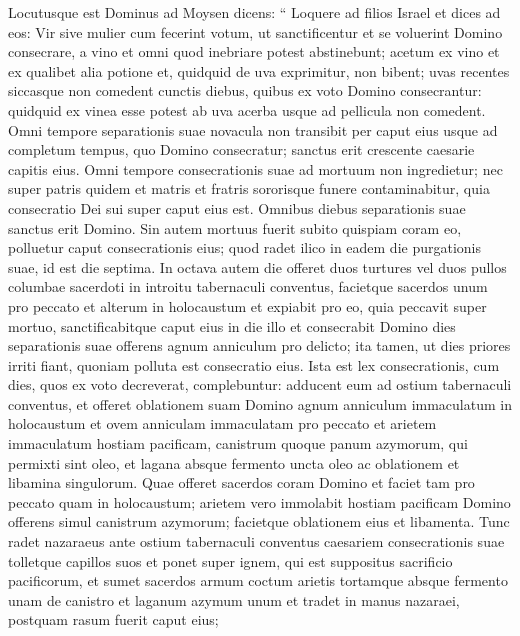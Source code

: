 \begin{biblechapter}
\begin{biblechapter}
\begin{biblechapter}
\begin{biblechapter}
\begin{biblechapter}
\begin{biblechapter}
\verse Locutusque est Dominus ad Moysen dicens: 
\verse “ Loquere ad filios Israel et dices ad eos: Vir sive mulier cum fecerint votum, ut sanctificentur et se voluerint Domino consecrare, 
\verse a vino et omni quod inebriare potest abstinebunt; acetum ex vino et ex qualibet alia potione et, quidquid de uva exprimitur, non bibent; uvas recentes siccasque non comedent 
\verse cunctis diebus, quibus ex voto Domino consecrantur: quidquid ex vinea esse potest ab uva acerba usque ad pellicula non comedent. 
\verse Omni tempore separationis suae novacula non transibit per caput eius usque ad completum tempus, quo Domino consecratur; sanctus erit crescente caesarie capitis eius. 
\verse Omni tempore consecrationis suae ad mortuum non ingredietur; 
\verse nec super patris quidem et matris et fratris sororisque funere contaminabitur, quia consecratio Dei sui super caput eius est. 
\verse Omnibus diebus separationis suae sanctus erit Domino.
 \verse Sin autem mortuus fuerit subito quispiam coram eo, polluetur caput consecrationis eius; quod radet ilico in eadem die purgationis suae, id est die septima. 
\verse In octava autem die offeret duos turtures vel duos pullos columbae sacerdoti in introitu tabernaculi conventus, 
\verse facietque sacerdos unum pro peccato et alterum in holocaustum et expiabit pro eo, quia peccavit super mortuo, sanctificabitque caput eius in die illo 
\verse et consecrabit Domino dies separationis suae offerens agnum anniculum pro delicto; ita tamen, ut dies priores irriti fiant, quoniam polluta est consecratio eius.
 \verse Ista est lex consecrationis, cum dies, quos ex voto decreverat, complebuntur: adducent eum ad ostium tabernaculi conventus, 
\verse et offeret oblationem suam Domino agnum anniculum immaculatum in holocaustum et ovem anniculam immaculatam pro peccato et arietem immaculatum hostiam pacificam, 
\verse canistrum quoque panum azymorum, qui permixti sint oleo, et lagana absque fermento uncta oleo ac oblationem et libamina singulorum. 
\verse Quae offeret sacerdos coram Domino et faciet tam pro peccato quam in holocaustum; 
\verse arietem vero immolabit hostiam pacificam Domino offerens simul canistrum azymorum; facietque oblationem eius et libamenta. 
\verse Tunc radet nazaraeus ante ostium tabernaculi conventus caesariem consecrationis suae tolletque capillos suos et ponet super ignem, qui est suppositus sacrificio pacificorum, 
\verse et sumet sacerdos armum coctum arietis tortamque absque fermento unam de canistro et laganum azymum unum et tradet in manus nazaraei, postquam rasum fuerit caput eius; 

\end{biblechapter}
\end{biblechapter}
\end{biblechapter}
\end{biblechapter}
\end{biblechapter}
\end{biblechapter}
